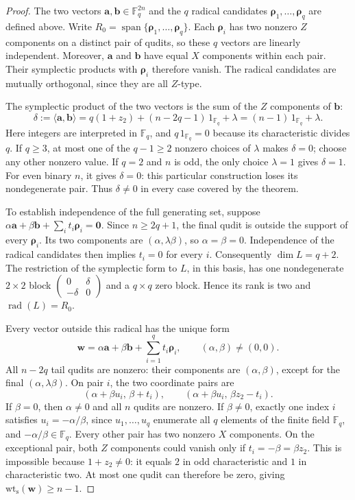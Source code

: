 \documentclass{article}
\newcommand{\F}{\mathbb{F}}
\newcommand{\vct}[1]{\boldsymbol{#1}} %
\newcommand{\wt}{\operatorname{wt_s}}
\begin{document}
\begin{proof}
The two vectors $\vct{a},\vct{b}\in\F_q^{2n}$ and the $q$ radical
candidates $\vct{\rho}_1,\ldots,\vct{\rho}_q$ are defined above.
Write $R_0=\operatorname{span}\{\vct{\rho}_1,\ldots,\vct{\rho}_q\}$.
Each $\vct{\rho}_i$ has two nonzero $Z$ components on a distinct
pair of qudits, so these $q$ vectors are linearly independent.
Moreover, $\vct{a}$ and $\vct{b}$ have equal $X$ components within
each pair. Their symplectic products with $\vct{\rho}_i$ therefore
vanish. The radical candidates are mutually orthogonal, since they
are all $Z$-type.

The symplectic product of the two vectors is the sum of the $Z$
components of $\vct{b}$:
\[
 \delta:=\langle\vct{a},\vct{b}\rangle
 =q(1+z_2)+(n-2q-1)\,1_{\F_q}+\lambda
 =(n-1)\,1_{\F_q}+\lambda.
\]
Here integers are interpreted in $\F_q$, and $q\,1_{\F_q}=0$
because its characteristic divides $q$. If $q\ge3$, at most one of
the $q-1\ge2$ nonzero choices of $\lambda$ makes $\delta=0$;
choose any other nonzero value. If $q=2$ and $n$ is odd, the only
choice $\lambda=1$ gives $\delta=1$. For even binary $n$, it gives
$\delta=0$: this particular construction loses its nondegenerate pair.
Thus $\delta\ne0$ in every case covered by the theorem.

To establish independence of the full generating set, suppose
$\alpha\vct{a}+\beta\vct{b}+\sum_i t_i\vct{\rho}_i=\vct{0}$.
Since $n\ge2q+1$, the final qudit is outside the support of every
$\vct{\rho}_i$. Its two components are $(\alpha,\lambda\beta)$,
so $\alpha=\beta=0$. Independence of the radical candidates then
implies $t_i=0$ for every $i$. Consequently $\dim L=q+2$.
The restriction of the symplectic form to $L$, in this basis, has
one nondegenerate $2\times2$ block
$\left(\begin{smallmatrix}0&\delta\\-\delta&0\end{smallmatrix}\right)$
and a $q\times q$ zero block. Hence its rank is two and
$\operatorname{rad}(L)=R_0$.

Every vector outside this radical has the unique form
\[
 \vct{w}=\alpha\vct{a}+\beta\vct{b}
       +\sum_{i=1}^q t_i\vct{\rho}_i,
 \qquad (\alpha,\beta)\ne(0,0).
\]
All $n-2q$ tail qudits are nonzero: their components are
$(\alpha,\beta)$, except for the final $(\alpha,\lambda\beta)$.
On pair $i$, the two coordinate pairs are
\[
 (\alpha+\beta u_i,\,\beta+t_i),\qquad
 (\alpha+\beta u_i,\,\beta z_2-t_i).
\]
If $\beta=0$, then $\alpha\ne0$ and all $n$ qudits are nonzero.
If $\beta\ne0$, exactly one index $i$ satisfies
$u_i=-\alpha/\beta$, since $u_1,\ldots,u_q$ enumerate all $q$ elements of the finite field $\F_q$,
and $-\alpha/\beta\in\F_q$.
Every other pair has two nonzero $X$ components. On the exceptional
pair, both $Z$ components could vanish only if
$t_i=-\beta=\beta z_2$. This is impossible because
$1+z_2\ne0$: it equals $2$ in odd characteristic and $1$ in
characteristic two. At most one qudit can therefore be zero, giving
$\wt(\vct{w})\ge n-1$.


\end{proof}
\end{document}
